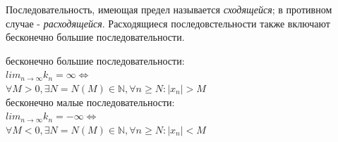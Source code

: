 \documentclass[oneside]{book}
\begin{document}
\begin{enumerate}
Последовательность, имеющая предел называется \textit{сходящейся}; в противном случае - \textit{расходящейся}.
Расходящиеся последовстельности также включают бесконечно большие последовательности.
\begin{center}
	бесконечно большие последовательности:\\
	$lim_{n \rightarrow \infty}{k_n} = \infty \Leftrightarrow$ \\
	$\forall M > 0, \exists N=N(M) \in \mathbb{N}, \forall n \geq N: |x_n| > M$ \\
	бесконечно малые последовательности:\\
	$lim_{n \rightarrow \infty}{k_n} = -\infty \Leftrightarrow$\\
	$\forall M < 0, \exists N=N(M) \in \mathbb{N}, \forall n \geq N: |x_n| < M$ \\
\end{center}


\end{enumerate}
\end{document}

